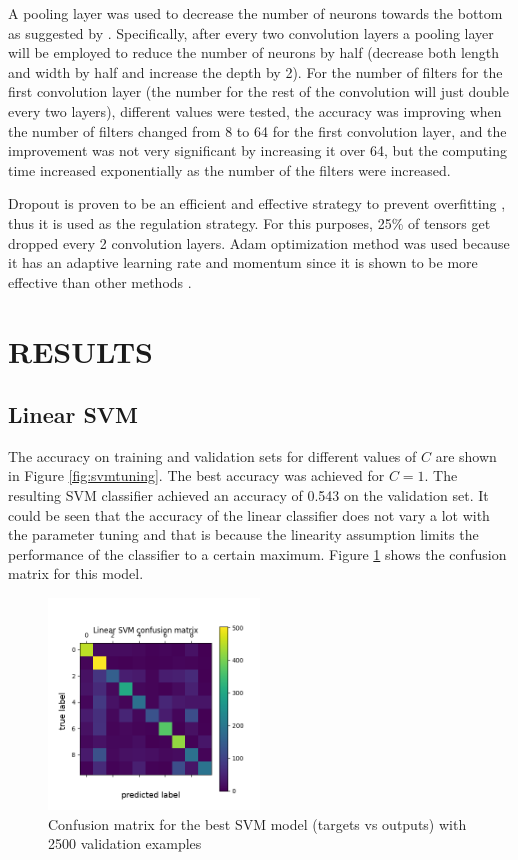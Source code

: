 \documentclass[letterpaper, 10 pt, conference]{ieeeconf}  %
\begin{document}
A pooling layer was used to decrease the number of neurons towards the bottom as suggested by \cite{lattner2016}. Specifically, after every two convolution layers a pooling layer will be employed to reduce the number of neurons by half (decrease both length and width by half and increase the depth by 2). For the number of filters for the first convolution layer (the number for the rest of the convolution will just double every two layers), different values were tested, the accuracy was improving when the number of filters changed from 8 to 64 for the first convolution layer, and the improvement was not very significant by increasing it over 64, but the computing time increased exponentially as the number of the filters were increased. 

Dropout is proven to be an efficient and effective strategy to prevent overfitting \cite{srivastava2014dropout}, thus it is used as the regulation strategy. For this purposes, 25\% of tensors get dropped every 2 convolution layers. Adam optimization method was used because it has an adaptive learning rate and momentum since it is shown to be more effective than other methods \cite{walia2017opt}.

\section{RESULTS}\label{sec:result}

\subsection{Linear SVM}
The accuracy on training and validation sets for different values of $C$ are shown in Figure \ref{fig:svmtuning}. The best accuracy was achieved for $C=1$. The resulting SVM classifier achieved an accuracy of 0.543 on the validation set. It could be seen that the accuracy of the linear classifier does not vary a lot with the parameter tuning and that is because the linearity assumption limits the performance of the classifier to a certain maximum. Figure \ref{fig:svmconf} shows the confusion matrix for this model.


\begin{figure}
	\begin{center}
			\includegraphics[width=0.5\textwidth]{figures/svm_conf.png}  %
		\caption{Confusion matrix for the best SVM model (targets vs outputs) with 2500 validation examples}
		\label{fig:svmconf}
	\end{center}
\end{figure}
\end{document}
